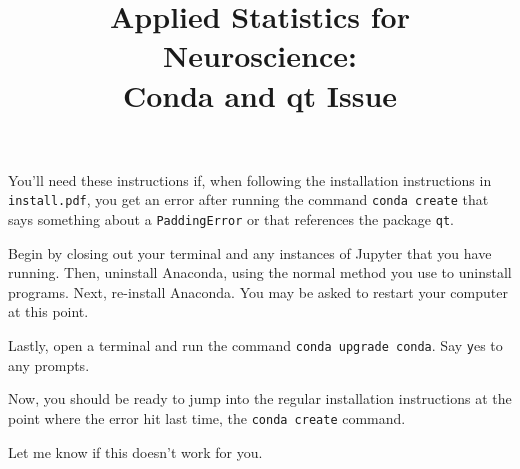 \documentclass[twoside]{article}
\title{Applied Statistics for Neuroscience:\\
	Conda and qt Issue}
\begin{document}
\maketitle

You'll need these instructions if, when following the
installation instructions in
\texttt{install.pdf},
you get an error after running the command \texttt{conda create}
that says something about a \texttt{PaddingError}
or that references the package \texttt{qt}.

Begin by closing out your terminal
and any instances of Jupyter that you have running.
Then, uninstall Anaconda,
using the normal method you use to uninstall programs.
Next, re-install Anaconda.
You may be asked to restart your computer at this point.

Lastly, open a terminal and 
run the command \texttt{conda upgrade conda}.
Say \texttt{y}es to any prompts.

Now, you should be ready to jump into the regular
installation instructions at the point where the error hit last time,
the \texttt{conda create} command.

Let me know if this doesn't work for you.
\end{document}
